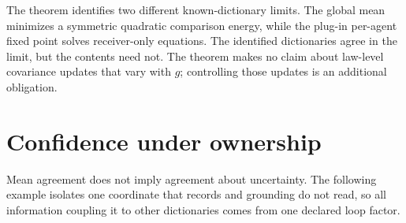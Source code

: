 The theorem identifies two different known-dictionary limits. The global mean minimizes a symmetric quadratic comparison energy, while the plug-in per-agent fixed point solves receiver-only equations. The identified dictionaries agree in the limit, but the contents need not. The theorem makes no claim about law-level covariance updates that vary with $g$; controlling those updates is an additional obligation.

\section{Confidence under ownership}
\label{it2:ch-confidence}

Mean agreement does not imply agreement about uncertainty. The following example isolates one coordinate that records and grounding do not read, so all information coupling it to other dictionaries comes from one declared loop factor.

